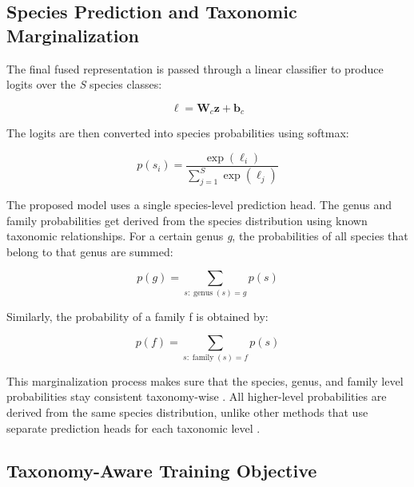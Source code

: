 \documentclass[preprint,12pt]{elsarticle}
\begin{document}
\subsection{Species Prediction and Taxonomic
Marginalization}\label{species-prediction-and-taxonomic-marginalization}

The final fused representation is passed through a linear classifier to
produce logits over the \emph{S} species classes:

\begin{equation}
\boldsymbol{\ell} = \mathbf{W}_{c}\mathbf{z} + \mathbf{b}_{c}
\label{eq:species-logits}
\end{equation}

The logits are then converted into species probabilities using softmax:

\begin{equation}
p(s_i) = \frac{\exp(\ell_i)}{\sum_{j=1}^{S}\exp(\ell_j)}
\label{eq:species-softmax}
\end{equation}

The proposed model uses a single species-level prediction head. The
genus and family probabilities get derived from the species distribution
using known taxonomic relationships. For a certain genus \emph{g}, the
probabilities of all species that belong to that genus are summed:

\begin{equation}
p(g) = \sum_{s:\operatorname{genus}(s)=g} p(s)
\label{eq:genus-marginalization}
\end{equation}

Similarly, the probability of a family f is obtained by:

\begin{equation}
p(f) = \sum_{s:\operatorname{family}(s)=f} p(s)
\label{eq:family-marginalization}
\end{equation}

This marginalization process makes sure that the species, genus, and
family level probabilities stay consistent taxonomy-wise
\citep{ref24,ref61}. All higher-level probabilities are
derived from the same species distribution, unlike other methods that
use separate prediction heads for each taxonomic level
\citep{ref23,ref26,ref60}.

\subsection{Taxonomy-Aware Training
Objective}\label{taxonomy-aware-training-objective}
\end{document}
